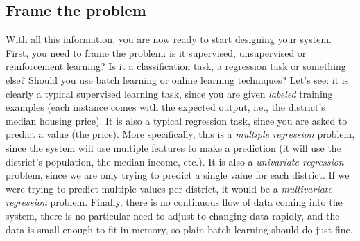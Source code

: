 \subsection{Frame the problem}
With all this information, you are now ready to start designing your system. First, you need to frame the problem: is it supervised, unsupervised or reinforcement learning? Is it a classification task, a regression task or something else? Should you use batch learning or online learning techniques? Let's see: it is clearly a typical supervised learning task, since you are given \emph{labeled} training examples (each instance comes with the expected output, i.e., the district's median housing price). It is also a typical regression task, since you are asked to predict a value (the price). More specifically, this is a \emph{multiple regression} problem, since the system will use multiple features to make a prediction (it will use the district's population, the median income, etc.). It is also a \emph{univariate regression} problem, since we are only trying to predict a single value for each district. If we were trying to predict multiple values per district, it would be a \emph{multivariate regression} problem. Finally, there is no continuous flow of data coming into the system, there is no particular need to adjust to changing data rapidly, and the data is small enough to fit in memory, so plain batch learning should do just fine.

